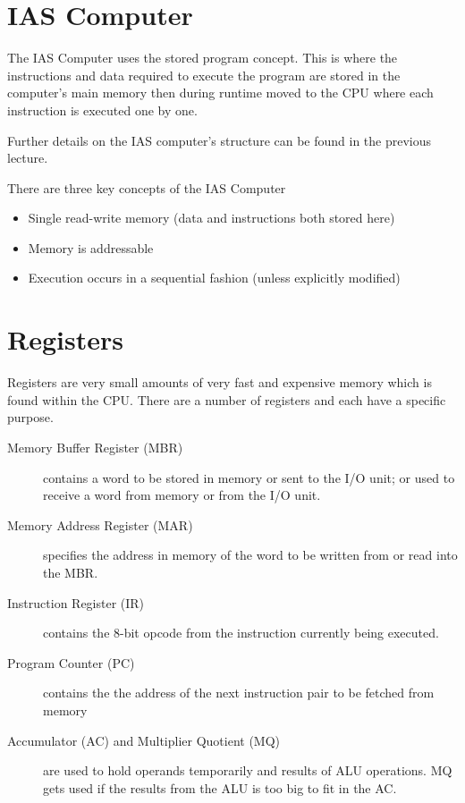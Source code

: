 
\section*{IAS Computer}
The IAS Computer uses the stored program concept. This is where the instructions and data required to execute the program are stored in the computer's main memory then during runtime moved to the CPU where each instruction is executed one by one.

Further details on the IAS computer's structure can be found in the previous lecture. 

There are three key concepts of the IAS Computer
\begin{itemize}
    \item Single read-write memory (data and instructions both stored here)
    \item Memory is addressable
    \item Execution occurs in a sequential fashion (unless explicitly modified)
\end{itemize}

\section*{Registers}
Registers are very small amounts of very fast and expensive memory which is found within the CPU. There are a number of registers and each have a specific purpose. 

\begin{description}
    \item[Memory Buffer Register (MBR)] contains a word to be stored in memory or sent to the I/O unit; or used to receive a word from memory or from the I/O unit.
    \item[Memory Address Register (MAR)] specifies the address in memory of the word to be written from or read into the MBR.
    \item[Instruction Register (IR)] contains the 8-bit opcode from the instruction currently being executed.
    \item[Program Counter (PC)] contains the the address of the next instruction pair to be fetched from memory
    \item[Accumulator (AC) and Multiplier Quotient (MQ)] are used to hold operands temporarily and results of ALU operations. MQ gets used if the results from the ALU is too big to fit in the AC.
\end{description} 

